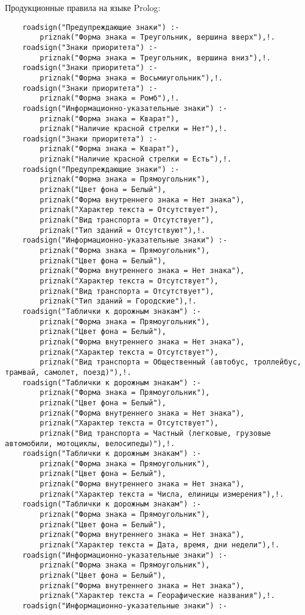 Продукционные правила на языке Prolog:
\begin{verbatim}
	roadsign("Предупреждающие знаки") :-
		priznak("Форма знака = Треугольник, вершина вверх"),!.
	roadsign("Знаки приоритета") :-
		priznak("Форма знака = Треугольник, вершина вниз"),!.
	roadsign("Знаки приоритета") :-
		priznak("Форма знака = Восьмиугольник"),!.
	roadsign("Знаки приоритета") :-
		priznak("Форма знака = Ромб"),!.
	roadsign("Информационно-указательные знаки") :-
		priznak("Форма знака = Кварат"),
		priznak("Наличие красной стрелки = Нет"),!.
	roadsign("Знаки приоритета") :-
		priznak("Форма знака = Кварат"),
		priznak("Наличие красной стрелки = Есть"),!.
	roadsign("Предупреждающие знаки") :-
		priznak("Форма знака = Прямоугольник"),
		priznak("Цвет фона = Белый"),
		priznak("Форма внутреннего знака = Нет знака"),
		priznak("Характер текста = Отсутствует"),
		priznak("Вид транспорта = Отсутствует"),
		priznak("Тип зданий = Отсутствуют"),!.
	roadsign("Информационно-указательные знаки") :-
		priznak("Форма знака = Прямоугольник"),
		priznak("Цвет фона = Белый"),
		priznak("Форма внутреннего знака = Нет знака"),
		priznak("Характер текста = Отсутствует"),
		priznak("Вид транспорта = Отсутствует"),
		priznak("Тип зданий = Городские"),!.
	roadsign("Таблички к дорожным знакам") :-
		priznak("Форма знака = Прямоугольник"),
		priznak("Цвет фона = Белый"),
		priznak("Форма внутреннего знака = Нет знака"),
		priznak("Характер текста = Отсутствует"),
		priznak("Вид транспорта = Общественный (автобус, троллейбус, трамвай, самолет, поезд)"),!.
	roadsign("Таблички к дорожным знакам") :-
		priznak("Форма знака = Прямоугольник"),
		priznak("Цвет фона = Белый"),
		priznak("Форма внутреннего знака = Нет знака"),
		priznak("Характер текста = Отсутствует"),
		priznak("Вид транспорта = Частный (легковые, грузовые автомобили, мотоциклы, велосипеды)"),!.
	roadsign("Таблички к дорожным знакам") :-
		priznak("Форма знака = Прямоугольник"),
		priznak("Цвет фона = Белый"),
		priznak("Форма внутреннего знака = Нет знака"),
		priznak("Характер текста = Числа, елиницы измерения"),!.
	roadsign("Таблички к дорожным знакам") :-
		priznak("Форма знака = Прямоугольник"),
		priznak("Цвет фона = Белый"),
		priznak("Форма внутреннего знака = Нет знака"),
		priznak("Характер текста = Дата, время, дни недели"),!.
	roadsign("Информационно-указательные знаки") :-
		priznak("Форма знака = Прямоугольник"),
		priznak("Цвет фона = Белый"),
		priznak("Форма внутреннего знака = Нет знака"),
		priznak("Характер текста = Георафические названия"),!.
	roadsign("Информационно-указательные знаки") :-

\end{verbatim}
